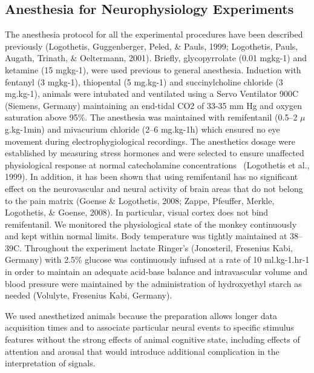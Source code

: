 \subsection{Anesthesia for Neurophysiology Experiments}
The anesthesia protocol for all the experimental procedures have been described previously (Logothetis, Guggenberger, Peled, \& Pauls, 1999; Logothetis, Pauls, Augath, Trinath, \& Oeltermann, 2001). Briefly, glycopyrrolate (0.01 mg{\textperiodcentered}kg{}-1) and ketamine (15 mg{\textperiodcentered}kg{}-1), were used previous to general anesthesia. Induction with fentanyl (3 mg{\textperiodcentered}kg{}-1), thiopental (5 mg.kg{}-1) and succinylcholine chloride (3 mg.kg{}-1), animals were intubated and ventilated using a Servo Ventilator 900C (Siemens, Germany) maintaining an end-tidal CO2 of 33-35 mm Hg and oxygen saturation above 95\%. The anesthesia was maintained with remifentanil (0.5--2 $\mu$g.kg{}-1min) and mivacurium chloride (2--6 mg.kg{}-1h) which ensured no eye movement during electrophygiological recordings. The anesthetics dosage were established by measuring stress hormones and were selected to ensure unaffected physiological response at normal catecholamine concentrations \ (Logothetis et al., 1999). In addition, it has been shown that using remifentanil has no significant effect on the neurovascular and neural activity of brain areas that do not belong to the pain matrix (Goense \& Logothetis, 2008; Zappe, Pfeuffer, Merkle, Logothetis, \& Goense, 2008). In particular, visual cortex does not bind remifentanil. We monitored the physiological state of the monkey continuously and kept within normal limits. Body temperature was tightly maintained at 38--39{\textdegree}C. Throughout the experiment lactate Ringer's (Jonosteril, Fresenius Kabi, Germany) with 2.5\% glucose was continuously infused at a rate of 10 ml.kg{}-1.hr{}-1 in order to maintain an adequate acid-base balance and intravascular volume and blood pressure were maintained by the administration of hydroxyethyl starch as needed (Volulyte, Fresenius Kabi, Germany). 

We used anesthetized animals because the preparation allows longer data acquisition times and to associate particular neural events to specific stimulus features without the strong effects of animal cognitive state, including effects of attention and arousal that would introduce additional complication in the interpretation of signals.

